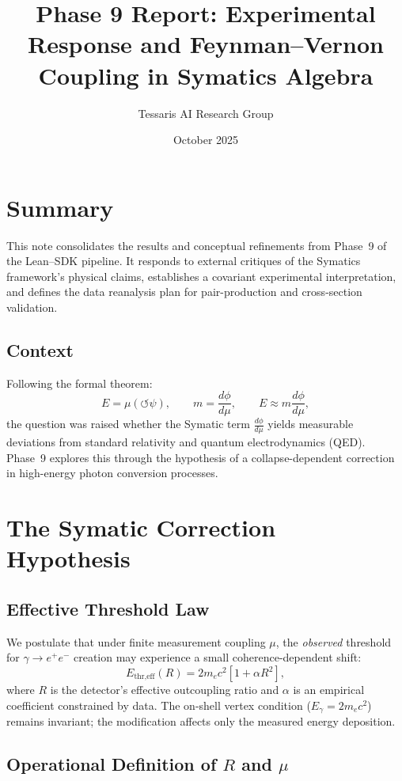 \documentclass[12pt]{article}
\title{Phase 9 Report: Experimental Response and Feynman--Vernon Coupling in Symatics Algebra}
\author{Tessaris AI Research Group}
\date{October 2025}
\begin{document}
\maketitle

\section*{Summary}

This note consolidates the results and conceptual refinements from Phase~9 of the Lean--SDK pipeline.  
It responds to external critiques of the Symatics framework’s physical claims, establishes a covariant experimental interpretation, and defines the data reanalysis plan for pair-production and cross-section validation.

\subsection*{Context}

Following the formal theorem:
\[
E = \mu(\circlearrowleft\psi), 
\qquad m = \frac{d\phi}{d\mu}, 
\qquad E \approx m \frac{d\phi}{d\mu},
\]
the question was raised whether the Symatic term $\frac{d\phi}{d\mu}$ yields measurable deviations from standard relativity and quantum electrodynamics (QED).  
Phase~9 explores this through the hypothesis of a collapse-dependent correction in high-energy photon conversion processes.

\section{The Symatic Correction Hypothesis}

\subsection*{Effective Threshold Law}

We postulate that under finite measurement coupling $\mu$, the \emph{observed} threshold for $\gamma \rightarrow e^+ e^-$ creation may experience a small coherence-dependent shift:
\[
E_{\text{thr,eff}}(R)
= 2 m_e c^2 [1 + \alpha R^2],
\]
where $R$ is the detector’s effective outcoupling ratio and $\alpha$ is an empirical coefficient constrained by data.  
The on-shell vertex condition ($E_\gamma = 2m_ec^2$) remains invariant; the modification affects only the measured energy deposition.

\subsection*{Operational Definition of $R$ and $\mu$}
\end{document}

